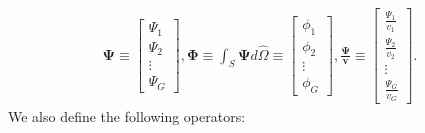 \documentclass[letterpaper]{mc2025}
\begin{document}
\begin{gather}
  \bm{\Psi} \equiv
  \begin{bmatrix}
    \Psi_1 \\
    \Psi_2 \\
    \vdots \\
    \Psi_G
  \end{bmatrix},
  \bm{\Phi} \equiv \int_S \bm{\Psi}d\hat{\Omega} \equiv
  \begin{bmatrix}
    \phi_1 \\
    \phi_2 \\
    \vdots \\
    \phi_G
  \end{bmatrix},
  \bm{\frac{\Psi}{v}} \equiv
  \begin{bmatrix}
    \frac{\Psi_1}{v_1} \\
    \frac{\Psi_2}{v_2} \\
    \vdots \\
    \frac{\Psi_G}{v_G}
  \end{bmatrix}.
\end{gather}
%
We also define the following operators:
%
\end{document}

